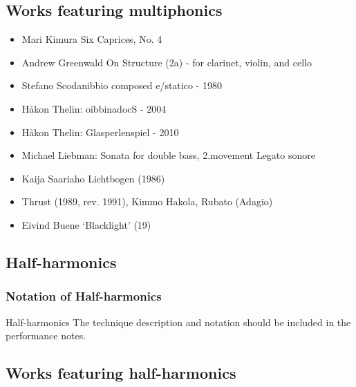 \subsection{Works featuring multiphonics}

\begin{itemize}
    \item Mari Kimura Six Caprices, No. 4 

    \item Andrew Greenwald On Structure (2a) - for clarinet, violin, and cello

    \item Stefano Scodanibbio composed e/statico - 1980

    \item Håkon Thelin: oibbinadocS - 2004

    \item Håkon Thelin: Glasperlenspiel - 2010

    \item Michael Liebman: Sonata for double bass, 2.movement Legato sonore


\item Kaija Saariaho Lichtbogen (1986)

\item Thrust (1989, rev. 1991),  Kimmo Hakola, Rubato (Adagio) 

\item Eivind Buene `Blacklight' (19)


\end{itemize}

\subsection{Half-harmonics}

\subsubsection{Notation of Half-harmonics}
Half-harmonics 
The technique description and notation should be included in the performance notes.


\subsection{Works featuring half-harmonics}

